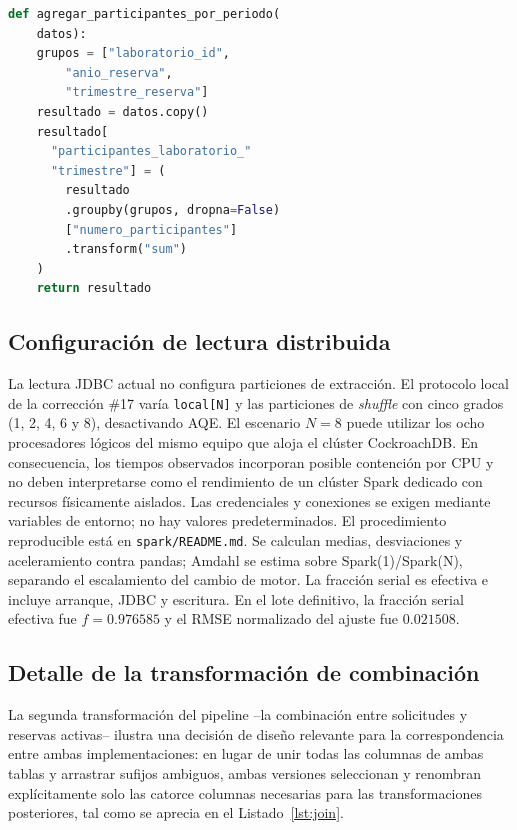 \documentclass[10pt,twocolumn]{article}
\begin{document}
\begin{lstlisting}[language=Python,caption={Agregación por ventana equivalente en la línea base pandas (\texttt{spark/baseline.py}).},label={lst:baseline}]
def agregar_participantes_por_periodo(
    datos):
    grupos = ["laboratorio_id",
        "anio_reserva",
        "trimestre_reserva"]
    resultado = datos.copy()
    resultado[
      "participantes_laboratorio_"
      "trimestre"] = (
        resultado
        .groupby(grupos, dropna=False)
        ["numero_participantes"]
        .transform("sum")
    )
    return resultado
\end{lstlisting}

\subsection{Configuración de lectura distribuida}

La lectura JDBC actual no configura particiones de extracción. El protocolo
local de la corrección \#17 varía \texttt{local[N]} y las particiones de
\emph{shuffle} con cinco grados (1, 2, 4, 6 y 8), desactivando AQE.
El escenario $N=8$ puede utilizar los ocho procesadores lógicos del mismo
equipo que aloja el clúster CockroachDB. En consecuencia, los tiempos
observados incorporan posible contención por CPU y no deben interpretarse como
el rendimiento de un clúster Spark dedicado con recursos físicamente aislados.
Las credenciales y conexiones se exigen mediante variables de entorno;
no hay valores predeterminados. El procedimiento reproducible está en
\texttt{spark/README.md}. Se calculan medias, desviaciones y aceleramiento
contra pandas; Amdahl se estima sobre Spark(1)/Spark(N), separando el
escalamiento del cambio de motor. La fracción serial es efectiva e incluye
arranque, JDBC y escritura. En el lote definitivo, la fracción serial efectiva
fue $f=0.976585$ y el RMSE normalizado del ajuste fue $0.021508$.
\subsection{Detalle de la transformación de combinación}

La segunda transformación del pipeline --la combinación entre solicitudes
y reservas activas-- ilustra una decisión de diseño relevante para la
correspondencia entre ambas implementaciones: en lugar de unir todas las
columnas de ambas tablas y arrastrar sufijos ambiguos, ambas versiones
seleccionan y renombran explícitamente solo las catorce columnas
necesarias para las transformaciones posteriores, tal como se aprecia en el
Listado~\ref{lst:join}.
\end{document}
